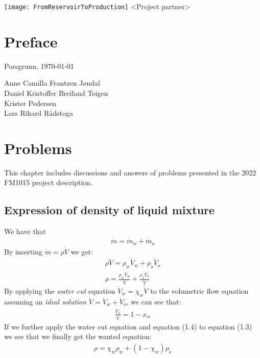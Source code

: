 \documentclass[%
oneside,    %
project,    %
nosummary   %
]{USN-MSc}
\newcommand{\myauthor}{%
G12 FM1015 2022
}
\newcommand{\myparticipants}{
Anne Camilla Frantzen Jøndal\\
Daniel Kristoffer Breiland Teigen\\
Krister Pedersen\\
Lars Rikard Rådstoga
}
\begin{document}
\USNtitlepage%
{%
  {\normalsize}
   \texttt{[image: FromReservoirToProduction]}}
{<Project partner>}
{%
\lipsum[6-7]
}


\chapter*{Preface}
\label{ch:preface}
\lipsum[1-3]
\bigskip
Porsgrunn, \today

\myparticipants %


\tableofcontents
{}





\chapter{Problems}
\label{ch:probs}
This chapter includes discussions and answers of problems presented in the 2022 FM1015 project description.
\section{Expression of density of liquid mixture}
We have that
\begin{eqnarray}
 \displaystyle \dot{m}=\dot{m}_w+\dot{m}_o
\end{eqnarray}
By inserting \(\dot{m} = \rho \dot{V}\) we get:
\begin{eqnarray}
 \displaystyle \rho \dot{V} =\rho_w \dot{V}_w  + \rho_o \dot{V}_o \\
  \displaystyle \rho = \frac{\rho_w \dot{V}_w } {\dot{V} } + \frac{\rho_o \dot{V}_o }{\dot{V} }
\end{eqnarray}
By applying the \textit{water cut} equation \(\dot{V}_w  = \chi_w \dot{V} \) to the volumetric flow equation assuming an \textit{ideal solution} \(\dot{V}  = \dot{V}_w  + \dot{V}_o \), we can see that:
\begin{eqnarray}
 \displaystyle \frac{\dot{V}_o}{\dot{V} } = 1- x_w
\end{eqnarray}
If we further apply the water cut equation and equation (1.4) to equation (1.3) we see that we finally get the wanted equation:
\begin{eqnarray}
 \displaystyle \rho =\chi_w \rho_w  + (1-\chi_w) \rho_o 
\end{eqnarray}
\end{document}
